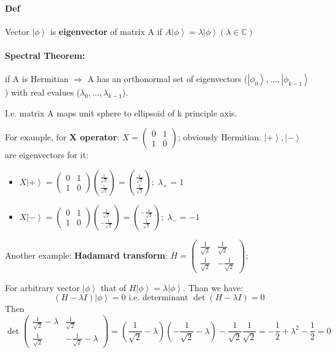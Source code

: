 \documentclass{scrartcl}
\newcommand{\cplx}{\mathbb{C}} %
\newcommand{\ket}[1]{\left| #1 \right>} %
\begin{document}
\paragraph{Def} Vector $\ket\phi$ is {\bf eigenvector} of matrix A if $A\ket\phi
= \lambda\ket\phi (\lambda \in \cplx)$

\paragraph{Spectral Theorem: } if A is Hermitian $\Rightarrow$ A has an
orthonormal set of eigenvectors ($\ket{\phi_0}, \dots, \ket{\phi_{k-1}}$) with
real evalues ($\lambda_0, \dots, \lambda_{k-1}$).

I.e. matrix A maps unit sphere to ellipsoid of k principle axis.

For example, for {\bf X operator}: $X = \begin{pmatrix} 0 & 1 \\ 1&
  0 \end{pmatrix}$; obviously Hermitian. $\ket+,\ket-$ are eigenvectors for it:
\begin{itemize}
\item $X\ket+ = \begin{pmatrix} 0 & 1 \\ 1 &
    0 \end{pmatrix}\binom{\frac1{\sqrt2}}{\frac1{\sqrt2}} =
  \binom{\frac1{\sqrt2}}{\frac1{\sqrt2}}; \; \lambda_+ = 1 $
\item $X\ket- = \begin{pmatrix} 0 & 1 \\ 1 &
    0 \end{pmatrix}\binom{\frac1{\sqrt2}}{-\frac1{\sqrt2}} =
  \binom{-\frac1{\sqrt2}}{\frac1{\sqrt2}}; \; \lambda_- = -1 $
\end{itemize}

Another example: {\bf Hadamard transform}: $H = \begin{pmatrix} \frac1{\sqrt2} &
  \frac1{\sqrt2} \\ \frac1{\sqrt2}& -\frac1{\sqrt2} \end{pmatrix}$;

For arbitrary vector $\ket\phi$ that of $H \ket\phi = \lambda\ket\phi$. Than we
have: $$(H-\lambda I)\ket\phi = 0 \text{ i.e. determinant } \det(H-\lambda I) =
0$$
Then $$\det \begin{pmatrix} \frac1{\sqrt2} - \lambda & \frac1{\sqrt2} \\
  \frac1{\sqrt2} & -\frac1{\sqrt2} - \lambda \end{pmatrix} =
\left(\frac1{\sqrt2} - \lambda \right)\left( -\frac1{\sqrt2} - \lambda \right) -
\frac1{\sqrt2} \frac1{\sqrt2} = -\frac12 + \lambda^2 -\frac12 = 0$$
\end{document}
